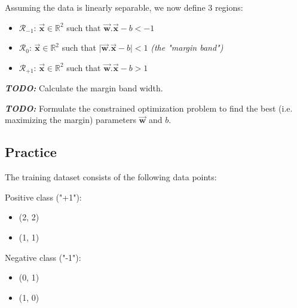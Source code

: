 \documentclass[]{article}
\newcommand{\R}{\mathbb{R}}
\newcommand{\vecx}{ \vec{\mathbf{x}} }
\newcommand{\vecxk}{ \vec{\mathbf{x_k}} }
\newcommand{\vecw}{ \vec{\mathbf{w}} }
\begin{document}
	\vspace{0.5cm}
	
	Assuming the data is linearly separable, we now define 3 regions:
	\begin{itemize}
		\item $\mathcal{R}_{-1}$: $\vecx \in \R^2$ such that $\vecw.\vecx - b < -1$
		\item $\mathcal{R}_{ 0}$: $\vecx \in \R^2$ such that $\mid \vecw.\vecx - b \mid < 1$ \textit{(the "margin band")}
		\item $\mathcal{R}_{+1}$: $\vecx \in \R^2$ such that $\vecw.\vecx - b > 1$
	\end{itemize}
	\noindent \textbf{\textit{TODO:}}
	Calculate the margin band width.
	
	\noindent \textbf{\textit{TODO:}}
	Formulate the constrained optimization problem to find the best (i.e. maximizing the margin) parameters $\vecw$ and $b$.
	
	\subsection{Practice}
	The training dataset consists of the following data points:
	
	Positive class ("+1"):
	\begin{itemize}
		\item (2, 2)
		\item (1, 1)
	\end{itemize}
	Negative class ("-1"):
	\begin{itemize}
		\item (0, 1)
		\item (1, 0)
	\end{itemize}
	
\end{document}
